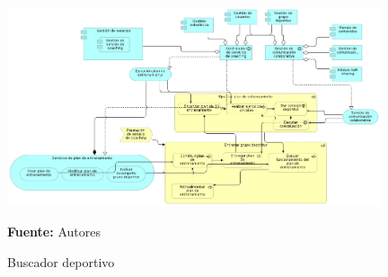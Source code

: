 \begin{figure}[!htb]
  \begin{center}
    \includegraphics[width=11cm]{./imagenes/application_usage/entrenamientodeportivo.png}
    \caption{Buscador deportivo}
    \label{fig:BF_BuscadorDeportivo}
    \textbf{Fuente:}  Autores
  \end{center}
\end{figure}

